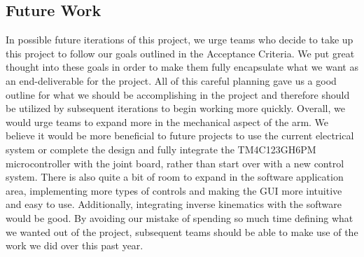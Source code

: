 \subsection{Future Work}
\noindent In possible future iterations of this project, we urge teams who decide to take up this project to follow our goals outlined in the Acceptance Criteria. We put great thought into these goals in order to make them fully encapsulate what we want as an end-deliverable for the project. All of this careful planning gave us a good outline for what we should be accomplishing in the project and therefore should be utilized by subsequent iterations to begin working more quickly. Overall, we would urge teams to expand more in the mechanical aspect of the arm. We believe it would be more beneficial to future projects to use the current electrical system or complete the design and fully integrate the TM4C123GH6PM microcontroller with the joint board, rather than start over with a new control system. There is also quite a bit of room to expand in the software application area, implementing more types of controls and making the GUI more intuitive and easy to use. Additionally, integrating inverse kinematics with the software would be good. By avoiding our mistake of spending so much time defining what we wanted out of the project, subsequent teams should be able to make use of the work we did over this past year.

